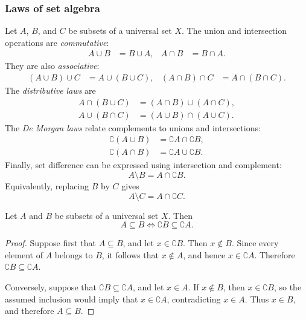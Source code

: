 \documentclass[11pt,a4paper]{amsart}
\begin{document}
\subsubsection{Laws of set algebra}

Let \(A\), \(B\), and \(C\) be subsets of a universal set \(X\). The union
and intersection operations are \emph{commutative}:
\begin{align*}
  A \cup B &= B \cup A, &
  A \cap B &= B \cap A.
\end{align*}
They are also \emph{associative}:
\begin{align*}
  (A \cup B) \cup C &= A \cup (B \cup C), &
  (A \cap B) \cap C &= A \cap (B \cap C).
\end{align*}
The \emph{distributive laws} are
\begin{align*}
  A \cap (B \cup C) &= (A \cap B) \cup (A \cap C), \\
  A \cup (B \cap C) &= (A \cup B) \cap (A \cup C).
\end{align*}
The \emph{De Morgan laws} relate complements to unions and intersections:
\begin{align*}
  \complement{(A \cup B)} &= \complement{A} \cap \complement{B}, \\
  \complement{(A \cap B)} &= \complement{A} \cup \complement{B}.
\end{align*}
Finally, set difference can be expressed using intersection and complement:
\[
  A \setminus B = A \cap \complement{B}.
\]
Equivalently, replacing \(B\) by \(C\) gives
\[
  A \setminus C = A \cap \complement{C}.
\]

\begin{theorem}
  Let \(A\) and \(B\) be subsets of a universal set \(X\). Then
  \[
    A \subseteq B \iff \complement{B} \subseteq \complement{A}.
  \]
\end{theorem}

\begin{proof}
  Suppose first that \(A \subseteq B\), and let
  \(x \in \complement{B}\). Then \(x \notin B\). Since every element of
  \(A\) belongs to \(B\), it follows that \(x \notin A\), and hence
  \(x \in \complement{A}\). Therefore
  \(\complement{B} \subseteq \complement{A}\).

  Conversely, suppose that
  \(\complement{B} \subseteq \complement{A}\), and let \(x \in A\). If
  \(x \notin B\), then \(x \in \complement{B}\), so the assumed inclusion
  would imply that \(x \in \complement{A}\), contradicting \(x \in A\).
  Thus \(x \in B\), and therefore \(A \subseteq B\).
\end{proof}
\end{document}
